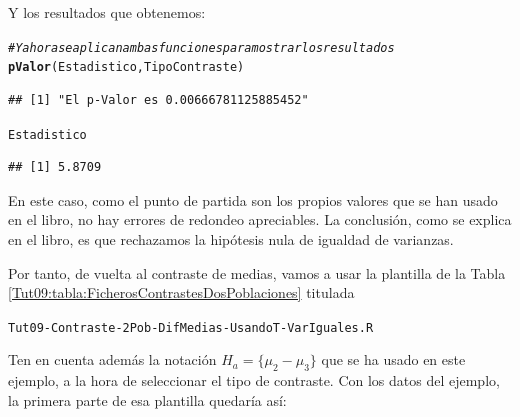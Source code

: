 \documentclass[10pt,a4paper]{article}\usepackage[]{graphicx}\usepackage[]{color}
\makeatletter
\newcommand{\hlcom}[1]{\textcolor[rgb]{0.678,0.584,0.686}{\textit{#1}}}%
\newcommand{\hlstd}[1]{\textcolor[rgb]{0.345,0.345,0.345}{#1}}%
\newcommand{\hlkwd}[1]{\textcolor[rgb]{0.737,0.353,0.396}{\textbf{#1}}}%
\newenvironment{kframe}{%
 \def\at@end@of@kframe{}%
 \ifinner\ifhmode%
  \def\at@end@of@kframe{\end{minipage}}%
  \begin{minipage}{\columnwidth}%
 \fi\fi%
 \def\FrameCommand##1{\hskip\@totalleftmargin \hskip-\fboxsep
 \colorbox{shadecolor}{##1}\hskip-\fboxsep
     \hskip-\linewidth \hskip-\@totalleftmargin \hskip\columnwidth}%
 \MakeFramed {\advance\hsize-\width
   \@totalleftmargin\z@ \linewidth\hsize
   \@setminipage}}%
 {\par\unskip\endMakeFramed%
 \at@end@of@kframe}
\newenvironment{knitrout}{}{} %
\newcounter {cont01}
\makeatother
\begin{document}
Y los resultados que obtenemos:
\begin{knitrout}
\color{fgcolor}\begin{kframe}
\begin{alltt}
 \hlcom{# Y ahora se aplican ambas funciones para mostrar los resultados}
     \hlkwd{pValor}\hlstd{(Estadistico,TipoContraste)}
\end{alltt}
\begin{verbatim}
## [1] "El p-Valor es 0.00666781125885452"
\end{verbatim}
\begin{alltt}
     \hlstd{Estadistico}
\end{alltt}
\begin{verbatim}
## [1] 5.8709
\end{verbatim}
\end{kframe}
\end{knitrout}
En este caso, como el punto de partida son los propios valores que se han usado en el libro, no hay errores de redondeo apreciables. La conclusión, como se explica en el libro, es que rechazamos la hipótesis nula de igualdad de varianzas.

Por tanto, de vuelta al contraste de medias, vamos a usar la plantilla de la Tabla \ref{Tut09:tabla:FicherosContrastesDosPoblaciones} titulada
\begin{center}
{\tt Tut09-Contraste-2Pob-DifMedias-UsandoT-VarIguales.R}
\end{center}
Ten en cuenta además la notación $H_a = \{\mu_2 - \mu_3\}$ que se ha usado en este ejemplo, a la hora de seleccionar el tipo de contraste. Con los datos del ejemplo, la primera parte de esa plantilla quedaría así:
\end{document}
